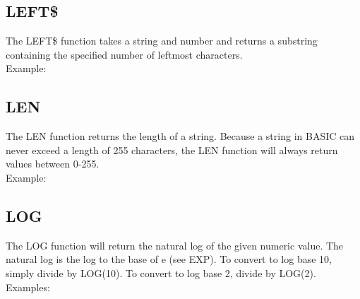 \subsection{LEFT\$}

The {\ttfamily LEFT\$} function takes a string and number and returns a
substring containing the specified number of leftmost characters.\\

Example:\\


\subsection{LEN}

The {\ttfamily LEN} function returns the length of a string.  Because a string
in BASIC can never exceed a length of 255 characters, the {\ttfamily LEN}
function will always return values between 0-255.\\

Example:\\


\subsection{LOG}

The {\ttfamily LOG} function will return the natural log of the given numeric
value.  The natural log is the log to the base of {\ttfamily e} (see {\ttfamily
EXP}).  To convert to log base 10, simply divide by {\ttfamily LOG(10)}.  To
convert to log base 2, divide by {\ttfamily LOG(2)}.\\

Examples:\\


